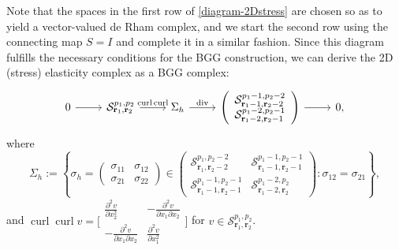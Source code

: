 \documentclass[final]{amsart}%
\newcommand{\0}{\mathaccent23}
\renewcommand\div{\operatorname{div}}
\newcommand\curl{\operatorname{curl}}
\newcommand{\br}{\mathbf r}
\begin{document}
Note that the spaces in the first row of \eqref{diagram-2Dstress} are chosen so as to yield a vector-valued de Rham complex, and we start the second row using the connecting map $S=I$ and complete it in a similar fashion. Since this diagram fulfills the necessary conditions for the BGG construction, we can derive the 2D (stress) elasticity complex as a BGG complex:
 \begin{equation}\label{complex-2Dstress}
\begin{tikzcd}
0 \arrow{r} &\mathcal S_{ \br_{1}, \br_{2}}^{p_{1}, p_{2}} \arrow{r}{\curl\curl} &
\Sigma_{h}
 \arrow{r}{\div}  &\left (
\begin{array}{c}
\mathcal S_{ \br_{1}-1, \br_{2}-2}^{p_{1}-1, p_{2}-2}\\
\mathcal S_{ \br_{1}-2, \br_{2}-1}^{p_{1}-2, p_{2}-1}
\end{array}
\right)  \arrow{r}{} & 0,
 \end{tikzcd}
\end{equation}
where 
$$
\Sigma_{h}:=\left\{\sigma_{h}=
\begin{pmatrix}
\sigma_{11} & \sigma_{12}\\
\sigma_{21} & \sigma_{22}
\end{pmatrix}
\in \begin{pmatrix}
\mathcal S_{ \br_{1}, \br_{2}-2}^{p_{1}, p_{2}-2} &\mathcal S_{ \br_{1}-1, \br_{2}-1}^{p_{1}-1, p_{2}-1} \\
\mathcal S_{ \br_{1}-1, \br_{2}-1}^{p_{1}-1, p_{2}-1} &\mathcal S_{ \br_{1}-2, \br_{2}}^{p_{1}-2, p_{2}}
\end{pmatrix} : \sigma_{12}=\sigma_{21}\right\},
$$
and $\curl\curl v=\Big[\begin{array}{cc}
\frac{\partial^2 v}{\partial x_2^2} & -\frac{\partial^2 v}{\partial x_1 \partial x_2}\\
-\frac{\partial^2 v}{\partial x_1 \partial x_2}&\frac{\partial^2 v}{\partial x_1^2}
\end{array}\Big]$ for $v\in \mathcal S_{ \br_{1}, \br_{2}}^{p_{1}, p_{2}}$.
\end{document}
